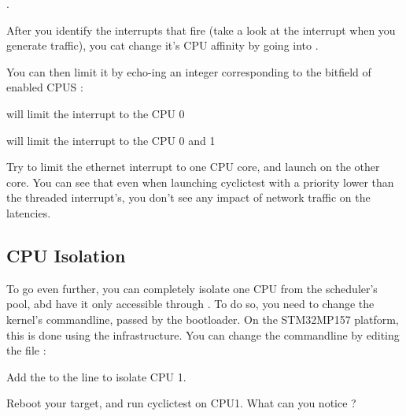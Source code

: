 .

After you identify the interrupts that fire (take a look at the  interrupt
when you generate traffic), you cat change it's CPU affinity by going into .

You can then limit it by echo-ing an integer corresponding to the bitfield of enabled CPUS :

 will limit the interrupt to the CPU 0

 will limit the interrupt to the CPU 0 and 1

Try to limit the ethernet interrupt to one CPU core, and launch  on the
other core. You can see that even when launching cyclictest with a priority lower than
the threaded interrupt's, you don't see any impact of network traffic on the latencies.

\subsection{CPU Isolation}

To go even further, you can completely isolate one CPU from the scheduler's pool,
abd have it only accessible through . To do so, you need to change
the kernel's commandline, passed by the bootloader. On the STM32MP157 platform,
this is done using the  infrastructure. You can change the
commandline by editing the  file :


Add the  to the  line to isolate CPU 1.

Reboot your target, and run cyclictest on CPU1. What can you notice ?

